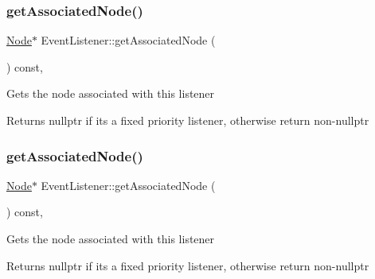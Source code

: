 \mbox{\label{classEventListener_a932ac8413ce8bec211320f36d8c30717}} 
\subsubsection{\texorpdfstring{get\+Associated\+Node()}{getAssociatedNode()}\hspace{0.1cm}{\footnotesize\ttfamily [1/2]}}
{\footnotesize\ttfamily \hyperlink{classNode}{Node}$\ast$ Event\+Listener\+::get\+Associated\+Node (\begin{DoxyParamCaption}{ }\end{DoxyParamCaption}) const\hspace{0.3cm}{\ttfamily [inline]}, {\ttfamily [protected]}}

Gets the node associated with this listener \begin{DoxyReturn}{Returns}
nullptr if it\textquotesingle{}s a fixed priority listener, otherwise return non-\/nullptr 
\end{DoxyReturn}
\mbox{\label{classEventListener_a932ac8413ce8bec211320f36d8c30717}} 
\subsubsection{\texorpdfstring{get\+Associated\+Node()}{getAssociatedNode()}\hspace{0.1cm}{\footnotesize\ttfamily [2/2]}}
{\footnotesize\ttfamily \hyperlink{classNode}{Node}$\ast$ Event\+Listener\+::get\+Associated\+Node (\begin{DoxyParamCaption}{ }\end{DoxyParamCaption}) const\hspace{0.3cm}{\ttfamily [inline]}, {\ttfamily [protected]}}

Gets the node associated with this listener \begin{DoxyReturn}{Returns}
nullptr if it\textquotesingle{}s a fixed priority listener, otherwise return non-\/nullptr 
\end{DoxyReturn}
\mbox{\label{classEventListener_ab19a7deec6bb7d936573ec33eff96891}} 
